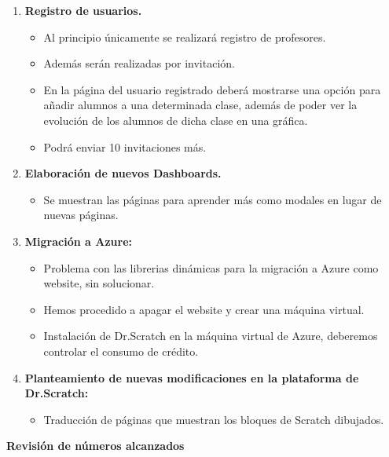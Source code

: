 \documentclass[a4paper,12pt]{letter}
\begin{document}
\begin{letter}
\begin{enumerate}
    
    \item{\textbf {Registro de usuarios.}}
    \begin{itemize}
            \item {Al principio únicamente se realizará registro de profesores.}
            \item {Además serán realizadas por invitación.}
            \item {En la página del usuario registrado deberá mostrarse una 
                    opción para añadir alumnos a una determinada clase, además 
                    de poder ver la evolución de los alumnos de dicha clase en
                    una gráfica.}
            \item {Podrá enviar 10 invitaciones más.}
    \end{itemize}
    
    \item{\textbf {Elaboración de nuevos Dashboards.}}
    \begin{itemize}
            \item {Se muestran las páginas para aprender más como modales en 
                    lugar de nuevas páginas.}
    \end{itemize}

    \item{\textbf {Migración a Azure:}}
    \begin{itemize}
        \item {Problema con las librerias dinámicas para la migración a Azure como website, sin solucionar.}
        \item {Hemos procedido a apagar el website y crear una máquina virtual.}
        \item {Instalación de Dr.Scratch en la máquina virtual de Azure, 
                deberemos controlar el consumo de crédito.}
    \end{itemize}

	\item{\textbf {Planteamiento de nuevas modificaciones en la plataforma de Dr.Scratch:}}
    \begin{itemize}
        \item {Traducción de páginas que muestran los bloques de Scratch dibujados.}
    \end{itemize}

\end{enumerate}

\vspace{2cm}
\textbf{{\LARGE Revisión de números alcanzados}}
\vspace{0.5cm}


\end{letter}
\end{document}
